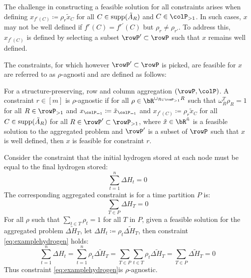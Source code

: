{The challenge in constructing a feasible solution for all constraints arises when defining \(x_{f^r(C)} \coloneqq \rho_r \tilde{x}_C\) for all \(C \in \operatorname{supp}(\tilde{A}_R)\) and \(C \in \colP_{>1}\). In such cases, \(x\) may not be well defined if \(f^r(C) = f^{r'}(C)\) but \(\rho_r \neq \rho_{r'}\). To address this, \(x_{f^r(C)}\) is defined by selecting a subset \(\rowP' \subset \rowP\) such that \(x\) remains well defined.

The constraints, for which however \(\rowP' \subset \rowP\) is picked, are feasible for \(x\) are referred to as \(\rho\)-agnosti and are defined as follows:  
\begin{definition}
  For a structure-preserving, row and column aggregation \((\rowP,\colP)\). A constraint \(r \in [m]\) is \(\rho\)-agnostic if for all \(\rho \in \bR^{\cup_{R \in \rowP_{>1}} R}\) such that \(\omega_R^T\rho_R = 1\) for all \(R \in \rowP_{>1}\)
   and  \(x_{\colP_{=1}} \coloneqq \tilde{x}_{\colP_{=1}}\) and \(x_{f^r(C)} \coloneqq \rho_r \tilde{x}_C\) for all \(C \in \operatorname{supp}(\tilde{A}_R)\) for all \(R \in \rowP' \subset \rowP_{>1}\), where \(\tilde{x} \in \bR^{\tilde{n}}\) is a feasible solution to the aggregated problem  and \(\rowP'\) is a subset of \(\rowP\) such that \(x\) is well defined, then \(x\) is feasible for constraint \(r\).
\end{definition}

\begin{example}
  Consider the constraint that the initial hydrogen stored at each node must be equal to the final hydrogen stored:
  \begin{equation}
    \label{eq:examplehydrogen}
    \sum_{t=1}^n \Delta H_t = 0
  \end{equation}
  The corresponding aggregated constraint is for a time partition \(P\) is:
  \begin{equation}
    \sum_{T \in P} \Delta H_T = 0
  \end{equation}
  For all \(\rho\) such that \(\sum_{t\in T}\rho_t = 1\) for all \(T\) in \(P\), given a feasible solution for the aggregated problem \(\tilde{\Delta H_T}\), let \(\Delta H_t \coloneqq \rho_t \tilde{\Delta H_T}\), then constraint \eqref{eq:examplehydrogen} holds: 
  \begin{equation}
    \sum_{t=1}^n \Delta{H_t} = \sum_{t=1}^n \rho_t \tilde{\Delta H_T} = \sum_{T \in P} \sum_{t\in T} \rho_t \tilde{\Delta H_T} = \sum_{T \in P} \tilde{ \Delta H_T} = 0
  \end{equation}
  Thus constraint \eqref{eq:examplehydrogen}is \(\rho\)-agnostic.
\end{example}

}
